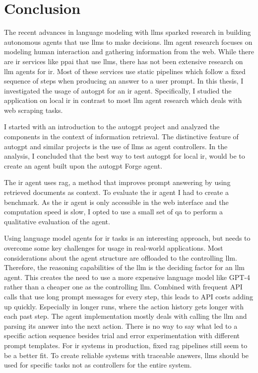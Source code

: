 \documentclass[../main.tex]{subfiles}
\begin{document}
\chapter{Conclusion}
\label{ch:conclusion}
\glsresetall
The recent advances in language modeling with \glspl{llm} sparked research
in building autonomous agents that use \glspl{llm} to make decisions.
\Gls{llm} agent research focuses on modeling human interaction and gathering
information from the web.
While there are \gls{ir} services like \gls{ppai} that use \glspl{llm}, there has not been
extensive research on \gls{llm} agents for \gls{ir}.
Most of these services use static pipelines which follow a fixed sequence of
steps when producing an answer to a user prompt.
In this thesis, I investigated the usage of \gls{autogpt} for an \gls{ir} agent.
Specifically, I studied the application on local \gls{ir} in contrast to most \gls{llm}
agent research which deals with web scraping tasks.

I started with an introduction to the \gls{autogpt} project and analyzed
the components in the context of information retrieval.
The distinctive feature of \gls{autogpt} and similar projects
is the use of \glspl{llm} as agent controllers.
In the analysis, I concluded that the best way to test \gls{autogpt}
for local \gls{ir}, would be to create an agent built upon the \gls{autogpt}
Forge agent.

The \gls{ir} agent uses \gls{rag}, a method that improves prompt answering
by using retrieved documents as context.
To evaluate the \gls{ir} agent I had to create a benchmark.
As the \gls{ir} agent is only accessible in the web interface and
the computation speed is slow, I opted to use a small set of \gls{qa}
to perform a qualitative evaluation of the agent.

Using language model agents for \gls{ir} tasks is an interesting approach,
but needs to overcome some key challenges for usage in real-world applications.
Most considerations about the agent structure are offloaded to the controlling \gls{llm}.
Therefore, the reasoning capabilities of the \gls{llm} is the deciding factor
for an \gls{llm} agent.
This creates the need to use a more expensive language model like GPT-4 rather than
a cheaper one as the controlling \gls{llm}.
Combined with frequent API calls that use long prompt messages for every step,
this leads to API costs adding up quickly.
Especially in longer runs, where the action history gets longer with each past step.
The agent implementation mostly deals with calling the \gls{llm} and parsing
its answer into the next action.
There is no way to say what led to a specific action sequence besides
trial and error experimentation with different prompt templates.
For \gls{ir} systems in production, fixed \gls{rag} pipelines still seem to
be a better fit.
To create reliable systems with traceable answers, \glspl{llm} should be used for
specific tasks not as controllers for the entire system.
\end{document}
